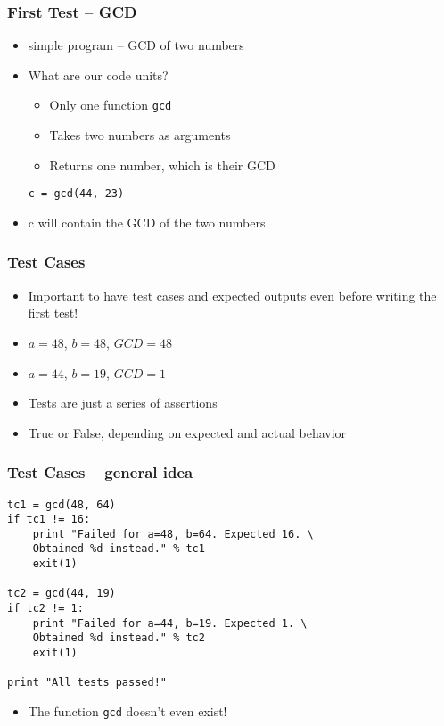 \documentclass[12pt,presentation]{beamer}
\begin{document}
\begin{frame}[fragile]
  \frametitle{First Test -- GCD}
  \begin{itemize}
  \item simple program -- GCD of two numbers
  \item What are our code units?
    \begin{itemize}
    \item Only one function \texttt{gcd}
    \item Takes two numbers as arguments
    \item Returns one number, which is their GCD
    \end{itemize}
\begin{lstlisting}
c = gcd(44, 23)
\end{lstlisting}
  \item c will contain the GCD of the two numbers.
  \end{itemize}
\end{frame}

\begin{frame}[fragile]
  \frametitle{Test Cases}
  \begin{itemize}
  \item Important to have test cases and expected outputs even before
    writing the first test!
  \item $a=48$, $b=48$, $GCD=48$
  \item $a=44$, $b=19$, $GCD=1$
  \item Tests are just a series of assertions
  \item True or False, depending on expected and actual behavior
  \end{itemize}

\end{frame}

\begin{frame}[fragile]
  \frametitle{Test Cases -- general idea}
\begin{lstlisting}
tc1 = gcd(48, 64)
if tc1 != 16:
    print "Failed for a=48, b=64. Expected 16. \
    Obtained %d instead." % tc1
    exit(1)

tc2 = gcd(44, 19)
if tc2 != 1:
    print "Failed for a=44, b=19. Expected 1. \
    Obtained %d instead." % tc2
    exit(1)

print "All tests passed!"
\end{lstlisting}
\begin{itemize}
\item The function \texttt{gcd} doesn't even exist!
\end{itemize}
\end{frame}
\end{document}
